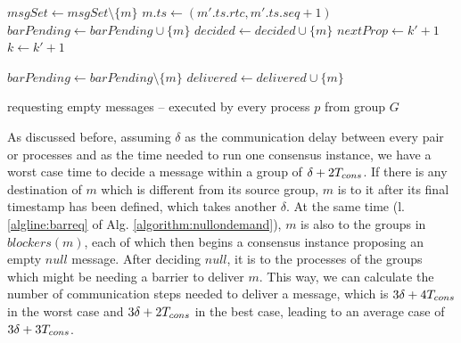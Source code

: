 \documentclass[times, 10pt]{article}
\begin{document}
\begin{algorithm}
\begin{distribalgo}[1]
\blankline
{}
    \STATE $msgSet \leftarrow msgSet \setminus \{m\}$
      \STATE $m.ts \leftarrow (m'.ts.rtc, m'.ts.seq + 1)$ \label{algline:chgts}
    \ENDIF     
     \label{algline:checkcons}
      \STATE $barPending \leftarrow barPending \cup \{m\}$
    \ENDIF
    \STATE $decided \leftarrow decided \cup \{m\}$
      \STATE {} \label{algline:barreq} 
    \ELSE
      \STATE {} 
    \ENDIF
  \ENDINDENT
  \STATE $nextProp \leftarrow k' + 1$
  \STATE $k \leftarrow k' + 1$
\ENDINDENT

\blankline
{}
  \STATE $barPending \leftarrow barPending \setminus \{m\}$
    \STATE {}
  \ENDIF
  \STATE $delivered \leftarrow delivered \cup \{m\}$

\blankline
\ENDINDENT

\caption{ requesting empty messages -- executed by every process $p$ from group $G$}
\label{algorithm:nullondemand}
\end{distribalgo}
\end{algorithm}
 
As discussed before, assuming $\delta$ as the communication delay between every pair or processes and \tcons{} as the time needed to run one consensus instance, we have a worst case time to decide a message within a group of $\delta + 2T_{cons}$. If there is any destination of $m$ which is different from its source group, $m$ is \rmc{} to it after its final timestamp has been defined, which takes another $\delta$. At the same time (l. \ref{algline:barreq} of Alg. \ref{algorithm:nullondemand}), $m$ is \rmc{} also to the groups in $blockers(m)$, each of which then begins a consensus instance proposing an empty $null$ message. After deciding $null$, it is \rmc{} to the processes of the groups which might be needing a barrier to deliver $m$. This way, we can calculate the number of communication steps needed to deliver a message, which is $3\delta + 4T_{cons}$ in the worst case and $3\delta + 2T_{cons}$ in the best case, leading to an average case of $3\delta + 3T_{cons}$.
\end{document}
